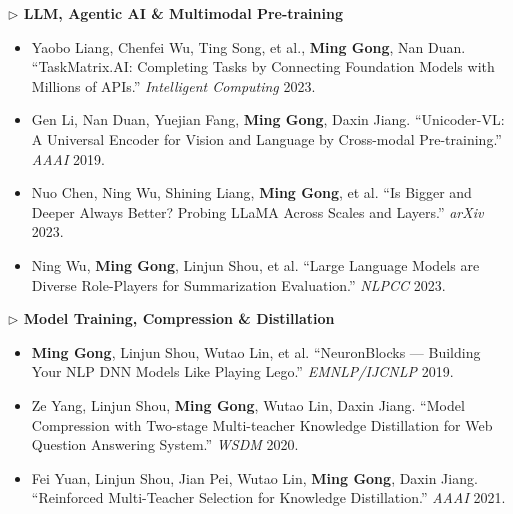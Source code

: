 \documentclass[10.5pt,letterpaper]{article}
\begin{document}
\noindent\textcolor{blue!60!black}{\textbf{$\triangleright$ LLM, Agentic AI \& Multimodal Pre-training}}
\begin{itemize}
  \item Yaobo Liang, Chenfei Wu, Ting Song, et al., \textbf{Ming Gong}, Nan Duan. ``TaskMatrix.AI: Completing Tasks by Connecting Foundation Models with Millions of APIs.'' \textit{Intelligent Computing} 2023.
  \item Gen Li, Nan Duan, Yuejian Fang, \textbf{Ming Gong}, Daxin Jiang. ``Unicoder-VL: A Universal Encoder for Vision and Language by Cross-modal Pre-training.'' \textit{AAAI} 2019.
  \item Nuo Chen, Ning Wu, Shining Liang, \textbf{Ming Gong}, et al. ``Is Bigger and Deeper Always Better? Probing LLaMA Across Scales and Layers.'' \textit{arXiv} 2023.
  \item Ning Wu, \textbf{Ming Gong}, Linjun Shou, et al. ``Large Language Models are Diverse Role-Players for Summarization Evaluation.'' \textit{NLPCC} 2023.
\end{itemize}

\noindent\textcolor{blue!60!black}{\textbf{$\triangleright$ Model Training, Compression \& Distillation}}
\begin{itemize}
  \item \textbf{Ming Gong}, Linjun Shou, Wutao Lin, et al. ``NeuronBlocks --- Building Your NLP DNN Models Like Playing Lego.'' \textit{EMNLP/IJCNLP} 2019.
  \item Ze Yang, Linjun Shou, \textbf{Ming Gong}, Wutao Lin, Daxin Jiang. ``Model Compression with Two-stage Multi-teacher Knowledge Distillation for Web Question Answering System.'' \textit{WSDM} 2020.
  \item Fei Yuan, Linjun Shou, Jian Pei, Wutao Lin, \textbf{Ming Gong}, Daxin Jiang. ``Reinforced Multi-Teacher Selection for Knowledge Distillation.'' \textit{AAAI} 2021.
\end{itemize}
\end{document}
